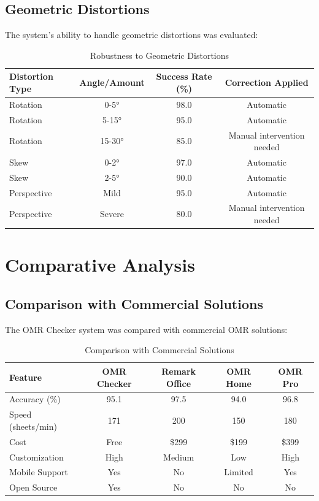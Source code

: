 \subsection{Geometric Distortions}

The system's ability to handle geometric distortions was evaluated:

\begin{table}[H]
\centering
\caption{Robustness to Geometric Distortions}
\begin{tabular}{|l|c|c|c|}
\hline
\textbf{Distortion Type} & \textbf{Angle/Amount} & \textbf{Success Rate (\%)} & \textbf{Correction Applied} \\
\hline
Rotation & 0-5° & 98.0 & Automatic \\
Rotation & 5-15° & 95.0 & Automatic \\
Rotation & 15-30° & 85.0 & Manual intervention needed \\
Skew & 0-2° & 97.0 & Automatic \\
Skew & 2-5° & 90.0 & Automatic \\
Perspective & Mild & 95.0 & Automatic \\
Perspective & Severe & 80.0 & Manual intervention needed \\
\hline
\end{tabular}
\label{tab:robustness_geometric}
\end{table}

\section{Comparative Analysis}

\subsection{Comparison with Commercial Solutions}

The OMR Checker system was compared with commercial OMR solutions:

\begin{table}[H]
\centering
\caption{Comparison with Commercial Solutions}
\begin{tabular}{|l|c|c|c|c|}
\hline
\textbf{Feature} & \textbf{OMR Checker} & \textbf{Remark Office} & \textbf{OMR Home} & \textbf{OMR Pro} \\
\hline
Accuracy (\%) & 95.1 & 97.5 & 94.0 & 96.8 \\
Speed (sheets/min) & 171 & 200 & 150 & 180 \\
Cost & Free & \$299 & \$199 & \$399 \\
Customization & High & Medium & Low & High \\
Mobile Support & Yes & No & Limited & Yes \\
Open Source & Yes & No & No & No \\
\hline
\end{tabular}
\label{tab:comparison_commercial}
\end{table}


